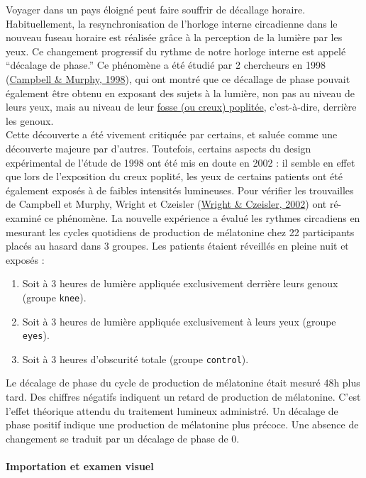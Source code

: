 \documentclass[
  a4paper,
]{article}
\providecommand{\tightlist}{%
  \setlength{\itemsep}{0pt}\setlength{\parskip}{0pt}}
\begin{document}
Voyager dans un pays éloigné peut faire souffrir de décallage horaire. Habituellement, la resynchronisation de l'horloge interne circadienne dans le nouveau fuseau horaire est réalisée grâce à la perception de la lumière
par les yeux. Ce changement progressif du rythme de notre horloge interne est appelé ``décalage de phase.'' Ce phénomène a été étudié par 2 chercheurs en 1998 (\protect\hyperlink{ref-Campbell1998}{Campbell \& Murphy, 1998}), qui ont montré que ce décallage de phase pouvait également être obtenu en exposant des sujets à la lumière, non pas au niveau de leurs yeux, mais au niveau de leur \href{https://fr.wikipedia.org/wiki/Fosse_poplitée}{fosse (ou creux) poplitée}, c'est-à-dire, derrière les genoux.\\
Cette découverte a été vivement critiquée par certains, et saluée comme une découverte majeure par d'autres. Toutefois, certains aspects du design expérimental de l'étude de 1998 ont été mis en doute en 2002 : il semble en effet que lors de l'exposition du creux poplité, les yeux de certains patients ont été également exposés à de faibles intensités lumineuses. Pour vérifier les trouvailles de Campbell et Murphy, Wright et Czeisler (\protect\hyperlink{ref-Wright2002}{Wright \& Czeisler, 2002}) ont ré-examiné ce phénomène. La nouvelle expérience a évalué les rythmes circadiens en mesurant les cycles quotidiens de production de mélatonine chez 22 participants placés au hasard dans 3 groupes. Les patients étaient réveillés en pleine nuit et exposés :

\begin{enumerate}
\def\labelenumi{\arabic{enumi}.}
\tightlist
\item
  Soit à 3 heures de lumière appliquée exclusivement derrière leurs genoux (groupe \texttt{knee}).
\item
  Soit à 3 heures de lumière appliquée exclusivement à leurs yeux (groupe \texttt{eyes}).
\item
  Soit à 3 heures d'obscurité totale (groupe \texttt{control}).
\end{enumerate}

Le décalage de phase du cycle de production de mélatonine était mesuré 48h plus tard. Des chiffres négatifs indiquent un retard de production de mélatonine. C'est l'effet théorique attendu du traitement lumineux administré. Un décalage de phase positif indique une production de mélatonine plus précoce. Une absence de changement se traduit par un décalage de phase de 0.

\hypertarget{importation-et-examen-visuel-3}{%
\paragraph{Importation et examen visuel}\label{importation-et-examen-visuel-3}}
\end{document}
